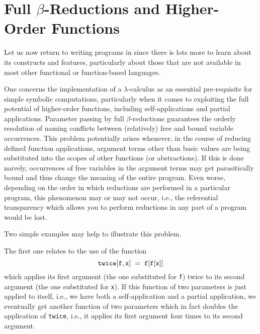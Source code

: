 \section{Full $\beta$-Reductions and Higher-Order Functions}
Let us now return to writing programs in \kir since there is lots more
to learn about its constructs and features, particularly about those 
that are not available in most other functional or function-based languages.

One concerns the implementation of a 
{\mys $\lambda$-calculus} as an essential pre-requisite for
simple {\mys symbolic computations}, particularly when it comes
to exploiting the full 
potential of {\mys higher-order functions}, including {\mys self-applications}
and {\mys partial applications}. Parameter passing by full
{\mys $\beta$-reductions} guarantees the orderly
resolution of {\mys naming conflicts} between (relatively) free
and bound variable occurrences.  This problem potentially  arises
whenever, in the course of reducing defined function applications,
argument terms other than basic values are being substituted into the scopes
of other functions (or abstractions). If this is done naively, occurrences
of free variables in the argument terms may get {\mys parasitically
bound} and thus change the meaning of the entire program. Even worse,
depending on the order in which reductions are
performed in a particular program, this phenomenon may 
or may not occur, i.e., the {\mys referential transparency} which allows you
to perform reductions in any part of a program would be lost.  

Two simple examples may help to illustrate this problem.

The first one relates to the use of the function
$$
{\tt twice[f,x]\;=\;f[f[x]]} 
$$
which applies its first argument (the one substituted for {\tt f}) twice
to its second argument (the one substituted for {\tt x}). If this function
of two parameters is just applied to itself, i.e., we have both
a {\mys self-application} and a {\mys partial application}, we eventually
 get another
function of two parameters which in fact doubles the application
 of {\tt twice},
i.e., it applies its first argument four times to its second argument.

